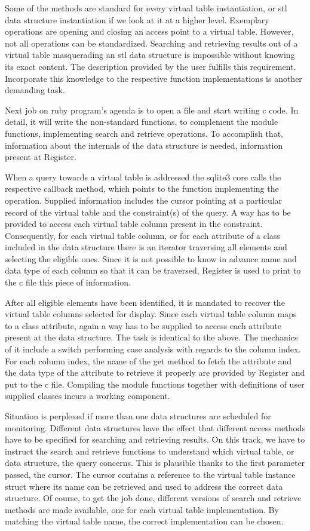 \documentclass[pdftex, 11pt, a4paper]{report}
\begin{document}
\par
Some of the methods are standard for every virtual table instantiation, or stl data structure instantiation if we look at it at a higher level. Exemplary operations are opening and closing an access point to a virtual table. However, not all operations can be standardized. Searching and retrieving results out of a virtual table masquerading an stl data structure is impossible without knowing its exact content. The description provided by the user fulfills this requirement. Incorporate this knowledge to the respective function implementations is another demanding task.
\par
Next job on ruby program's agenda is to open a file and start writing c code. In detail, it will write the non-standard functions, to complement the module functions, implementing search and retrieve operations. To accomplish that, information about the internals of the data structure is needed, information present at Register. 
\par
When a query towards a virtual table is addressed the sqlite3 core calls the respective callback method, which points to the function implementing the operation. Supplied information includes the cursor pointing at a particular record of the virtual table and the constraint(s) of the query. A way has to be provided to access each virtual table column present in the constraint. Consequently, for each virtual table column, or for each attribute of a class included in the data structure there is an iterator traversing all elements and selecting the eligible ones. Since it is not possible to know in advance name and data type of each column so that it can be traversed, Register is used to print to the c file this piece of information.
\par
After all eligible elements have been identified, it is mandated to recover the virtual table columns selected for display. Since each virtual table column maps to a class attribute, again a way has to be supplied to access each attribute present at the data structure. The task is identical to the above. The mechanics of it include a switch performing case analysis with regards to the column index. For each column index, the name of the get method to fetch the attribute and the data type of the attribute to retrieve it properly are provided by Register and put to the c file. Compiling the module functions together with definitions of user supplied classes incurs a working component.
\par
Situation is perplexed if more than one data structures are scheduled for monitoring. Different data structures have the effect that different access methods have to be specified for searching and retrieving results. On this track, we have to instruct the search and retrieve functions to understand which virtual table, or data structure, the query concerns. This is plausible thanks to the first parameter passed, the cursor. The cursor contains a reference to the virtual table instance struct where its name can be retrieved and used to address the correct data structure. Of course, to get the job done, different versions of search and retrieve methods are made available, one for each virtual table implementation. By matching the virtual table name, the correct implementation can be chosen.
\par
\end{document}
